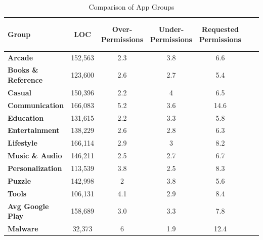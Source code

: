 \documentclass{llncs}
\begin{document}
\begin{table}[]
\begin{center}
\caption{Comparison of App Groups}
\label{Table:topGroups}
 \begin{tabular}{ | l | c | c | c | c | c |  c |} \hline

  \bfseries Group & \bfseries ~~~~ LOC ~~~~  & \bfseries Over-Permissions & \bfseries Under-Permissions & \bfseries Requested Permissions \\ \hline


 	\bfseries Arcade &	152,563	  &	2.3 &	3.8 &	6.6 \\ \hline
 	\bfseries Books \& Reference &	123,600	  &	2.6 &	2.7 &	5.4 \\ \hline
	\bfseries Casual &	150,396  &	2.2 &	4 &	6.5 \\ \hline
 	\bfseries Communication & 	166,083  &	5.2 &	3.6 &	14.6 \\ \hline
	\bfseries Education &	131,615  &	2.2 &	3.3 &	5.8 \\ \hline
 	\bfseries Entertainment &	138,229  &	2.6 &	2.8 &	6.3 \\ \hline
 	\bfseries Lifestyle &	166,114  &	2.9 &	3 &	8.2 \\ \hline
 	\bfseries Music \& Audio &	146,211	  &	2.5 &	2.7 &	6.7 \\ \hline
  	\bfseries Personalization &	113,539	   &	3.8 &	2.5 &	8.3 \\ \hline
 	\bfseries Puzzle &	142,998  &	2 &	3.8 & 	5.6 \\ \hline
	\bfseries Tools	 & 106,131  &	4.1 &	2.9 &	8.4 \\ \hline \hline

	\bfseries Avg Google Play	 & 158,689  & 3.0 &	3.3 &	7.8 \\ \hline
	\bfseries Malware	 & 32,373  & 6 &	1.9 &	 12.4 \\ \hline



\end{tabular}
\end{center}
\end{table}
\end{document}

